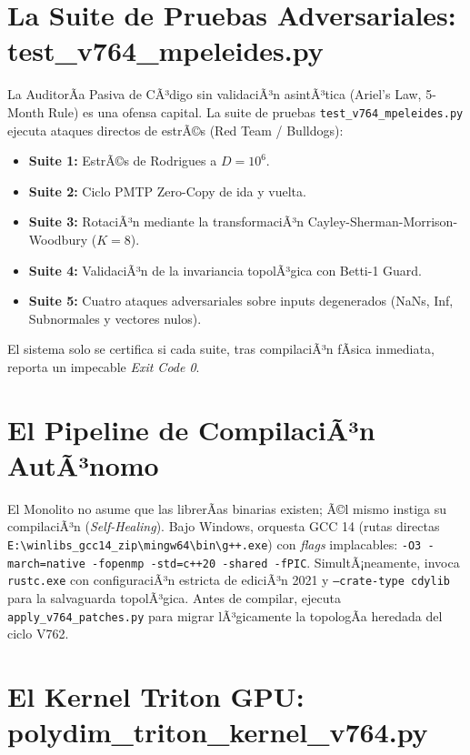 \section{La Suite de Pruebas Adversariales: test\_v764\_mpeleides.py}


La AuditorÃ­a Pasiva de CÃ³digo sin validaciÃ³n asintÃ³tica (Ariel's Law, 5-Month Rule) es una ofensa capital. La suite de pruebas \texttt{test\_v764\_mpeleides.py} ejecuta ataques directos de estrÃ©s (Red Team / Bulldogs):
\begin{itemize}
    \item \textbf{Suite 1:} EstrÃ©s de Rodrigues a \(D=10^6\).
    \item \textbf{Suite 2:} Ciclo PMTP Zero-Copy de ida y vuelta.
    \item \textbf{Suite 3:} RotaciÃ³n mediante la transformaciÃ³n Cayley-Sherman-Morrison-Woodbury (\(K=8\)).
    \item \textbf{Suite 4:} ValidaciÃ³n de la invariancia topolÃ³gica con Betti-1 Guard.
    \item \textbf{Suite 5:} Cuatro ataques adversariales sobre inputs degenerados (NaNs, Inf, Subnormales y vectores nulos).
\end{itemize}
El sistema solo se certifica si cada suite, tras compilaciÃ³n fÃ­sica inmediata, reporta un impecable \textit{Exit Code 0}.

\section{El Pipeline de CompilaciÃ³n AutÃ³nomo}


El Monolito no asume que las librerÃ­as binarias existen; Ã©l mismo instiga su compilaciÃ³n (\textit{Self-Healing}).
Bajo Windows, orquesta GCC 14 (rutas directas \texttt{E:\textbackslash winlibs\_gcc14\_zip\textbackslash mingw64\textbackslash bin\textbackslash g++.exe}) con \textit{flags} implacables: \texttt{-O3 -march=native -fopenmp -std=c++20 -shared -fPIC}.
SimultÃ¡neamente, invoca \texttt{rustc.exe} con configuraciÃ³n estricta de ediciÃ³n 2021 y \texttt{--crate-type cdylib} para la salvaguarda topolÃ³gica. Antes de compilar, ejecuta \texttt{apply\_v764\_patches.py} para migrar lÃ³gicamente la topologÃ­a heredada del ciclo V762.

\section{El Kernel Triton GPU: polydim\_triton\_kernel\_v764.py}


